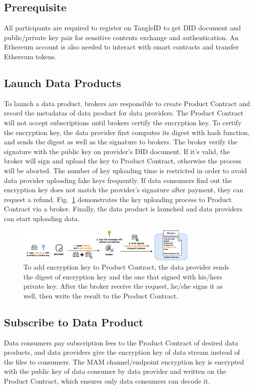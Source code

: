 \documentclass[conference]{IEEEtran}
\begin{document}
\subsection{Prerequisite}
All participants are required to register on TangleID to get DID document and public/private key pair for sensitive contents exchange and authentication. An Ethereum account is also needed to interact with smart contracts and transfer Ethereum tokens.

\subsection{Launch Data Products}
To launch a data product, brokers are responsible to create Product Contract and record the metadatas of data product for data providers. The Product Contract will not accept subscriptions until brokers certify the encryption key. To certify the encryption key, the data provider first computes its digest with hash function, and sends the digest as well as the signature to brokers. The broker verify the signature with the public key on provider's DID document. If it's valid, the broker will sign and upload the key to Product Contract, otherwise the process will be aborted. The number of key uploading time is restricted in order to avoid data provider uploading fake keys frequently. If data consumers find out the encryption key does not match the provider's signature after payment, they can request a refund. Fig.~\ref{fig:key_upload} demonstrates the key uploading process to Product Contract via a broker. Finally, the data product is launched and data providers can start uploading data.
\begin{figure}[h]
    \centering
    \includegraphics[width=3.5in]{key_upload}
    \caption{To add encryption key to Product Contract, the data provider sends the digest of encryption key and the one that signed with his/hers private key. After the broker receive the request, he/she signs it as well, then write the result to the Product Contract.}
    \label{fig:key_upload}
\end{figure}

\subsection{Subscribe to Data Product}
Data consumers pay subscription fees to the Product Contract of desired data products, and data providers give the encryption key of data stream instead of the files to consumers. The MAM channel/endpoint encryption key is encrypted with the public key of data consumer by data provider and written on the Product Contract, which ensures only data consumers can decode it.
\end{document}
